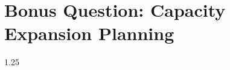 \section{Bonus Question: Capacity Expansion Planning}
\label{sec:chap_5}

\begin{spacing}{1.25}


    
\end{spacing}
